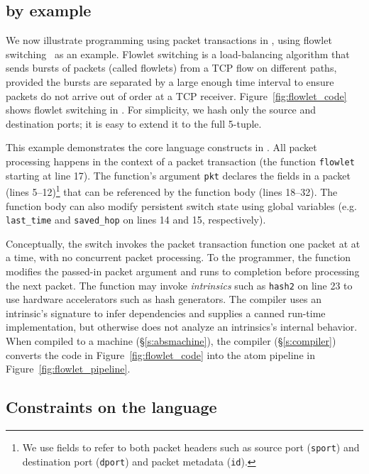 \subsection{\pktlanguage by example}
\label{ss:flowlet}

We now illustrate programming using packet transactions in \pktlanguage, using
flowlet switching~\cite{flowlets} as an example. Flowlet switching is a
load-balancing algorithm that sends bursts of packets (called flowlets) from a
TCP flow on different paths, provided the bursts are separated by a large
enough time interval to ensure packets do not arrive out of order at a TCP
receiver. Figure~\ref{fig:flowlet_code} shows flowlet switching in
\pktlanguage. For simplicity, we hash only the source and destination ports; it
is easy to extend it to the full 5-tuple.

This example demonstrates the core language constructs in \pktlanguage. All
packet processing happens in the context of a packet transaction (the function
\texttt{flowlet} starting at line 17). The function's argument {\tt pkt}
declares the fields in a packet (lines 5--12)\footnote{We use fields to refer
to both packet headers such as source port ({\tt sport}) and destination port
({\tt dport}) and packet metadata ({\tt id}).} that can be referenced by the
function body (lines 18--32).  The function body can also modify persistent
switch state using global variables (e.g.  \texttt{last\_time} and
\texttt{saved\_hop} on lines 14 and 15, respectively).

Conceptually, the switch invokes the packet transaction function one packet at
at a time, with no concurrent packet processing. To the programmer, the
function modifies the passed-in packet argument and runs to completion before
processing the next packet.  The function may invoke \textit{intrinsics} such
as \texttt{hash2} on line 23 to use hardware accelerators such as hash
generators.  The \pktlanguage compiler uses an intrinsic's signature to infer
dependencies and supplies a canned run-time implementation, but otherwise does
not analyze an intrinsics's internal behavior. When compiled to a \absmachine
machine (\S\ref{s:absmachine}), the \pktlanguage compiler (\S\ref{s:compiler})
converts the code in Figure~\ref{fig:flowlet_code} into the atom pipeline in
Figure~\ref{fig:flowlet_pipeline}.

\subsection{Constraints on the language}
\label{ss:constraints}

